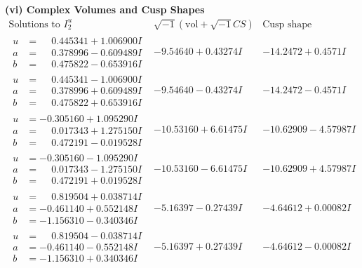 \documentclass[1p]{elsarticle_modified}
\theoremstyle{definition}
\newcommand{\I}{\sqrt{-1}}
\begin{document}
\newpage\flushleft \textbf{(vi) Complex Volumes and Cusp Shapes}
$$\begin{array}{c|c|c}  
\text{Solutions to }I^u_{2}& \I (\text{vol} + \sqrt{-1}CS) & \text{Cusp shape}\\
 \hline 
\begin{aligned}
u &= \phantom{-}0.445341 + 1.006900 I \\
a &= \phantom{-}0.378996 - 0.609489 I \\
b &= \phantom{-}0.475822 - 0.653916 I\end{aligned}
 & -9.54640 + 0.43274 I & -14.2472 + 0.4571 I \\ \hline\begin{aligned}
u &= \phantom{-}0.445341 - 1.006900 I \\
a &= \phantom{-}0.378996 + 0.609489 I \\
b &= \phantom{-}0.475822 + 0.653916 I\end{aligned}
 & -9.54640 - 0.43274 I & -14.2472 - 0.4571 I \\ \hline\begin{aligned}
u &= -0.305160 + 1.095290 I \\
a &= \phantom{-}0.017343 + 1.275150 I \\
b &= \phantom{-}0.472191 - 0.019528 I\end{aligned}
 & -10.53160 + 6.61475 I & -10.62909 - 4.57987 I \\ \hline\begin{aligned}
u &= -0.305160 - 1.095290 I \\
a &= \phantom{-}0.017343 - 1.275150 I \\
b &= \phantom{-}0.472191 + 0.019528 I\end{aligned}
 & -10.53160 - 6.61475 I & -10.62909 + 4.57987 I \\ \hline\begin{aligned}
u &= \phantom{-}0.819504 + 0.038714 I \\
a &= -0.461140 + 0.552148 I \\
b &= -1.156310 - 0.340346 I\end{aligned}
 & -5.16397 - 0.27439 I & -4.64612 + 0.00082 I \\ \hline\begin{aligned}
u &= \phantom{-}0.819504 - 0.038714 I \\
a &= -0.461140 - 0.552148 I \\
b &= -1.156310 + 0.340346 I\end{aligned}
 & -5.16397 + 0.27439 I & -4.64612 - 0.00082 I \\ \hline\begin{aligned}

\end{aligned}
\end{array}$$
\end{document}
